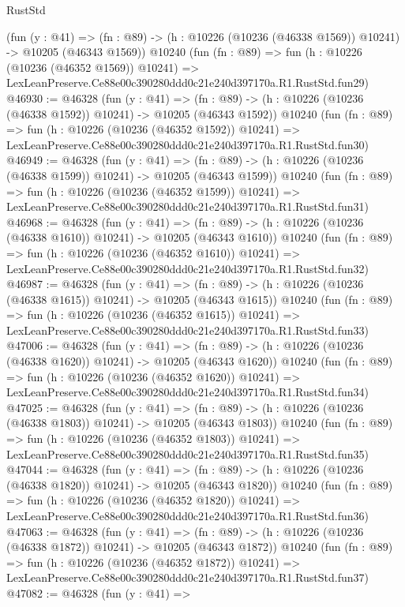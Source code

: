 \begin{lexlean}{RustStd}
\begin{coremodule}
    (fun (y : @41) =>
    (fn : @89) -> (h : @10226 (@10236 (@46338 @1569)) @10241) -> @10205 (@46343 @1569))
    @10240
    (fun (fn : @89) =>
    fun (h : @10226 (@10236 (@46352 @1569)) @10241) =>
    LexLeanPreserve.Ce88e00c390280ddd0c21e240d397170a.R1.RustStd.fun29)
@46930 := @46328
    (fun (y : @41) =>
    (fn : @89) -> (h : @10226 (@10236 (@46338 @1592)) @10241) -> @10205 (@46343 @1592))
    @10240
    (fun (fn : @89) =>
    fun (h : @10226 (@10236 (@46352 @1592)) @10241) =>
    LexLeanPreserve.Ce88e00c390280ddd0c21e240d397170a.R1.RustStd.fun30)
@46949 := @46328
    (fun (y : @41) =>
    (fn : @89) -> (h : @10226 (@10236 (@46338 @1599)) @10241) -> @10205 (@46343 @1599))
    @10240
    (fun (fn : @89) =>
    fun (h : @10226 (@10236 (@46352 @1599)) @10241) =>
    LexLeanPreserve.Ce88e00c390280ddd0c21e240d397170a.R1.RustStd.fun31)
@46968 := @46328
    (fun (y : @41) =>
    (fn : @89) -> (h : @10226 (@10236 (@46338 @1610)) @10241) -> @10205 (@46343 @1610))
    @10240
    (fun (fn : @89) =>
    fun (h : @10226 (@10236 (@46352 @1610)) @10241) =>
    LexLeanPreserve.Ce88e00c390280ddd0c21e240d397170a.R1.RustStd.fun32)
@46987 := @46328
    (fun (y : @41) =>
    (fn : @89) -> (h : @10226 (@10236 (@46338 @1615)) @10241) -> @10205 (@46343 @1615))
    @10240
    (fun (fn : @89) =>
    fun (h : @10226 (@10236 (@46352 @1615)) @10241) =>
    LexLeanPreserve.Ce88e00c390280ddd0c21e240d397170a.R1.RustStd.fun33)
@47006 := @46328
    (fun (y : @41) =>
    (fn : @89) -> (h : @10226 (@10236 (@46338 @1620)) @10241) -> @10205 (@46343 @1620))
    @10240
    (fun (fn : @89) =>
    fun (h : @10226 (@10236 (@46352 @1620)) @10241) =>
    LexLeanPreserve.Ce88e00c390280ddd0c21e240d397170a.R1.RustStd.fun34)
@47025 := @46328
    (fun (y : @41) =>
    (fn : @89) -> (h : @10226 (@10236 (@46338 @1803)) @10241) -> @10205 (@46343 @1803))
    @10240
    (fun (fn : @89) =>
    fun (h : @10226 (@10236 (@46352 @1803)) @10241) =>
    LexLeanPreserve.Ce88e00c390280ddd0c21e240d397170a.R1.RustStd.fun35)
@47044 := @46328
    (fun (y : @41) =>
    (fn : @89) -> (h : @10226 (@10236 (@46338 @1820)) @10241) -> @10205 (@46343 @1820))
    @10240
    (fun (fn : @89) =>
    fun (h : @10226 (@10236 (@46352 @1820)) @10241) =>
    LexLeanPreserve.Ce88e00c390280ddd0c21e240d397170a.R1.RustStd.fun36)
@47063 := @46328
    (fun (y : @41) =>
    (fn : @89) -> (h : @10226 (@10236 (@46338 @1872)) @10241) -> @10205 (@46343 @1872))
    @10240
    (fun (fn : @89) =>
    fun (h : @10226 (@10236 (@46352 @1872)) @10241) =>
    LexLeanPreserve.Ce88e00c390280ddd0c21e240d397170a.R1.RustStd.fun37)
@47082 := @46328
    (fun (y : @41) =>

\end{coremodule}
\end{lexlean}
